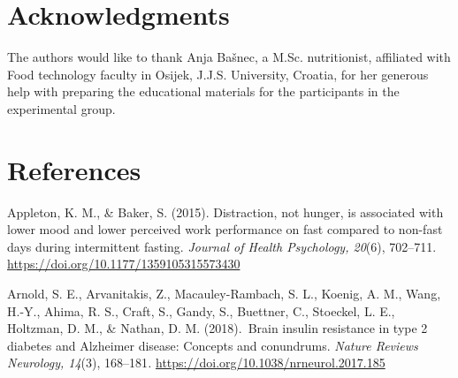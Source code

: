 \documentclass[authordate, empirical]{jote-new-article}
\begin{document}
\section{Acknowledgments}



The authors would like to thank Anja Bašnec, a M.Sc. nutritionist, affiliated with Food technology faculty in Osijek, J.J.S. University, Croatia, for her generous help with preparing the educational materials for the participants in the experimental group.






\section{References }









Appleton, K. M., \& Baker, S. (2015). Distraction, not hunger, is associated with lower mood and lower perceived work performance on fast compared to non-fast days during intermittent fasting.\emph{ Journal of Health Psychology, 20}(6), 702--711. \url{https://doi.org/10.1177/1359105315573430}



Arnold, S. E., Arvanitakis, Z., Macauley-Rambach, S. L., Koenig, A. M., Wang, H.-Y., Ahima, R. S., Craft, S., Gandy, S., Buettner, C., Stoeckel, L. E., Holtzman, D. M., \& Nathan, D. M. (2018). Brain insulin resistance in type 2 diabetes and Alzheimer disease: Concepts and conundrums.\emph{ Nature Reviews Neurology, 14}(3), 168--181\emph{.} \url{https://doi.org/10.1038/nrneurol.2017.185}



\end{document}
